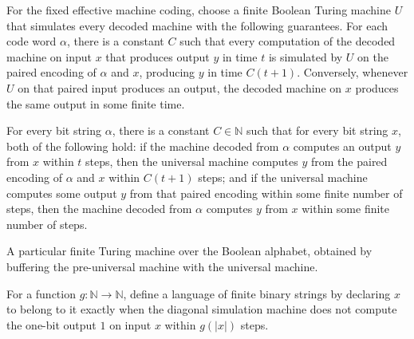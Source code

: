 \begin{definition}
\label{Complexity.TimeHierarchy.univTM}
\leanok
{}
For the fixed effective machine coding, choose a finite Boolean Turing machine $U$ that
simulates every decoded machine with the following guarantees. For each code word
$\alpha$, there is a constant $C$ such that every computation of the decoded machine on
input $x$ that produces output $y$ in time $t$ is simulated by $U$ on the paired
encoding of $\alpha$ and $x$, producing $y$ in time $C(t+1)$. Conversely, whenever $U$
on that paired input produces an output, the decoded machine on $x$ produces the same
output in some finite time.
\end{definition}

\begin{lemma}
\label{Complexity.TimeHierarchy.univTM_spec}
\leanok
{}
For every bit string $\alpha$, there is a constant $C\in\mathbb{N}$ such that for every
bit string $x$, both of the following hold: if the machine decoded from $\alpha$
computes an output $y$ from $x$ within $t$ steps, then the universal machine computes
$y$ from the paired encoding of $\alpha$ and $x$ within $C(t+1)$ steps; and if the
universal machine computes some output $y$ from that paired encoding within some finite
number of steps, then the machine decoded from $\alpha$ computes $y$ from $x$ within
some finite number of steps.
\end{lemma}

\begin{definition}
\label{Complexity.TimeHierarchy.diagSim}
\leanok
{}
A particular finite Turing machine over the Boolean alphabet, obtained by buffering the
pre-universal machine with the universal machine.
\end{definition}

\begin{definition}
\label{Complexity.TimeHierarchy.diagLang}
\leanok
{}
For a function $g : \mathbb{N} \to \mathbb{N}$, define a language of finite binary
strings by declaring $x$ to belong to it exactly when the diagonal simulation machine
does not compute the one-bit output $1$ on input $x$ within $g(|x|)$ steps.
\end{definition}

